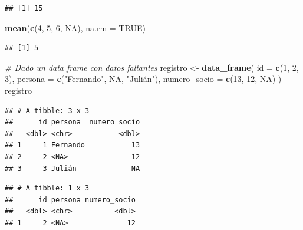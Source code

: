 \documentclass[]{book}
\newenvironment{Shaded}{\begin{snugshade}}{\end{snugshade}}
\newcommand{\KeywordTok}[1]{\textcolor[rgb]{0.13,0.29,0.53}{\textbf{#1}}}
\newcommand{\DataTypeTok}[1]{\textcolor[rgb]{0.13,0.29,0.53}{#1}}
\newcommand{\DecValTok}[1]{\textcolor[rgb]{0.00,0.00,0.81}{#1}}
\newcommand{\StringTok}[1]{\textcolor[rgb]{0.31,0.60,0.02}{#1}}
\newcommand{\CommentTok}[1]{\textcolor[rgb]{0.56,0.35,0.01}{\textit{#1}}}
\newcommand{\OtherTok}[1]{\textcolor[rgb]{0.56,0.35,0.01}{#1}}
\newcommand{\OperatorTok}[1]{\textcolor[rgb]{0.81,0.36,0.00}{\textbf{#1}}}
\newcommand{\NormalTok}[1]{#1}
\theoremstyle{definition}
\theoremstyle{definition}
\theoremstyle{definition}
\theoremstyle{remark}
\begin{document}
\begin{verbatim}
## [1] 15
\end{verbatim}

\begin{Shaded}
\begin{Highlighting}[]
\KeywordTok{mean}\NormalTok{(}\KeywordTok{c}\NormalTok{(}\DecValTok{4}\NormalTok{, }\DecValTok{5}\NormalTok{, }\DecValTok{6}\NormalTok{, }\OtherTok{NA}\NormalTok{), }\DataTypeTok{na.rm =} \OtherTok{TRUE}\NormalTok{)}
\end{Highlighting}
\end{Shaded}

\begin{verbatim}
## [1] 5
\end{verbatim}

\begin{Shaded}
\begin{Highlighting}[]
\CommentTok{# Dado un data frame con datos faltantes}
\NormalTok{registro <-}\StringTok{ }\KeywordTok{data_frame}\NormalTok{(}
  \DataTypeTok{id =} \KeywordTok{c}\NormalTok{(}\DecValTok{1}\NormalTok{, }\DecValTok{2}\NormalTok{, }\DecValTok{3}\NormalTok{),}
  \DataTypeTok{persona =} \KeywordTok{c}\NormalTok{(}\StringTok{"Fernando"}\NormalTok{, }\OtherTok{NA}\NormalTok{, }\StringTok{"Julián"}\NormalTok{),}
  \DataTypeTok{numero_socio =} \KeywordTok{c}\NormalTok{(}\DecValTok{13}\NormalTok{, }\DecValTok{12}\NormalTok{, }\OtherTok{NA}\NormalTok{)}
\NormalTok{)}
\NormalTok{registro}
\end{Highlighting}
\end{Shaded}

\begin{verbatim}
## # A tibble: 3 x 3
##      id persona  numero_socio
##   <dbl> <chr>           <dbl>
## 1     1 Fernando           13
## 2     2 <NA>               12
## 3     3 Julián             NA
\end{verbatim}

\begin{Shaded}
\end{Shaded}

\begin{verbatim}
## # A tibble: 1 x 3
##      id persona numero_socio
##   <dbl> <chr>          <dbl>
## 1     2 <NA>              12
\end{verbatim}
\end{document}
